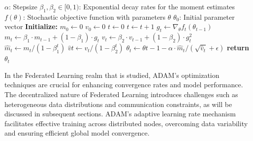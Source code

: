 \begin{algorithm}[H]
    \caption{ADAM optimizer algorithm}
    \label{alg:adam}
    \begin{algorithmic}
        \Require $\alpha$: Stepsize
        \Require $\beta_1, \beta_2 \in [0, 1)$: Exponential decay rates for the moment estimates
        \Require $f(\theta)$: Stochastic objective function with parameters $\theta$
        \Require $\theta_0$: Initial parameter vector
        \Statex
        \Statex \textbf{Initialize:}
        \Statex $m_0 \leftarrow 0$ 
        \Statex $v_0 \leftarrow 0$ 
        \Statex $t \leftarrow 0$ 
        \Statex
        \Statex $t \leftarrow t + 1$
        \Statex $g_t \leftarrow \nabla_{\theta} f_t(\theta_{t-1})$ 
        \Statex $m_t \leftarrow \beta_1 \cdot m_{t-1} + (1 - \beta_1) \cdot g_t$ 
        \Statex $v_t \leftarrow \beta_2 \cdot v_{t-1} + (1 - \beta_2) \cdot g_t^2$ 
        \Statex $\hat{m}_t \leftarrow m_t / (1 - \beta_1^t)$ 
        \Statex $\hat{v}t \leftarrow v_t / (1 - \beta_2^t)$ 
        \Statex $\theta_t \leftarrow \theta{t-1} - \alpha \cdot \hat{m}_t / (\sqrt{\hat{v}_t} + \epsilon)$ 
        \EndWhile
        \Statex \textbf{return} $\theta_t$ 
    \end{algorithmic}
\end{algorithm}

In the Federated Learning realm that is studied, ADAM's optimization techniques are crucial for enhancing convergence rates and model performance.
The decentralized nature of Federated Learning introduces challenges such as heterogeneous data distributions and communication constraints, as will be
discussed in subsequent sections.
ADAM's adaptive learning rate mechanism facilitates effective training across distributed nodes, overcoming data variability and ensuring
efficient global model convergence.
